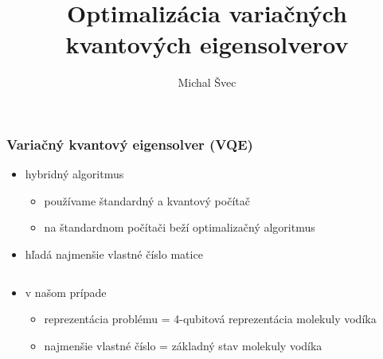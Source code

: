 \documentclass{beamer}
\title{Optimalizácia variačných kvantových eigensolverov}
\author{Michal Švec}
\institute{doc. RNDr. Martin Plesch, PhD.}
\date{}
\begin{document}
\begin{frame}
	\titlepage
\end{frame}

\begin{frame}
	\frametitle{Variačný kvantový eigensolver (VQE)}
			
	\begin{itemize}
		\item hybridný algoritmus
		\begin {itemize}
		    \item používame štandardný a kvantový počítač
            \item na štandardnom počítači beží optimalizačný algoritmus
	    \end{itemize}
        \item hľadá najmenšie vlastné číslo matice
    \end{itemize}
    \begin{columns}[T] %
        \begin{column}{0.0\textwidth} %
        \end{column}
        \begin{column}{0.95\textwidth} %
        \end{column}
    \end{columns}

    \begin{itemize}
		\item v našom prípade
		\begin{itemize}
		    \item reprezentácia problému = 4-qubitová reprezentácia molekuly vodíka 
            \item najmenšie vlastné číslo = základný stav molekuly vodíka
	    \end{itemize}
    \end{itemize}
			
\end{frame}
\end{document}
